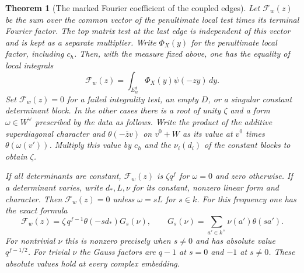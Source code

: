 \documentclass[a4paper,11pt]{article}
\newtheorem{theorem}[proposition]{Theorem}
\theoremstyle{definition}
\theoremstyle{remark}
\numberwithin{equation}{section}
\begin{document}
\begin{theorem}[The marked Fourier coefficient of the coupled edges]
\label{thm:markedgauss386}
Let \(\mathcal F_w(z)\) be the sum over the common vector of
the penultimate local test times its terminal Fourier factor.
The top matrix test at the last edge is independent of this
vector and is kept as a separate multiplier. Write \(\Phi_X(y)\)
for the penultimate local factor, including \(c_h\). Then, with
the measure fixed above, one has the equality of local integrals
\[
       \mathcal F_w(z)=\int_{E_w^d}\Phi_X(y)\psi(-zy)\,dy.
\]
Set
\(\mathcal F_w(z)=0\) for a failed integrality test, an empty
\(D\), or a singular constant determinant block. In the other
cases there is a root of unity \(\zeta\) and a form
\(\omega\in W^\vee\) prescribed by the data as follows.
Write the product of the additive superdiagonal character and
\(\theta(-\bar z v)\) on \(v^0+W\) as its value at \(v^0\)
times \(\theta(\omega(v'))\). Multiply this value by \(c_h\)
and the \(\nu_i(d_i)\) of the constant blocks to obtain \(\zeta\).

If all determinants are constant, \(\mathcal F_w(z)\) is
\(\zeta q^f\) for \(\omega=0\) and zero otherwise. If a
determinant varies, write \(d_*,L,\nu\) for its constant,
nonzero linear form and character. Then \(\mathcal F_w(z)=0\)
unless \(\omega=sL\) for \(s\in k\). For this frequency
one has the exact formula
\[
 \mathcal F_w(z)=
     \zeta\,q^{f-1}\theta(-s d_*)G_s(\nu),\qquad
 G_s(\nu)=\sum_{a'\in k^\times}\nu(a')\theta(sa').
\]
For nontrivial \(\nu\) this is nonzero precisely when \(s\ne0\)
and has absolute value \(q^{f-1/2}\). For trivial \(\nu\) the
Gauss factors are \(q-1\) at \(s=0\) and \(-1\) at \(s\ne0\).
These absolute values hold at every complex embedding.
\end{theorem}
\end{document}
